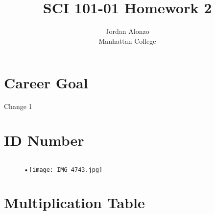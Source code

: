 \documentclass[11pt]{article}
\begin{document}
\title{SCI 101-01 Homework 2}
\author{Jordan Alonzo\\
Manhattan College}
\maketitle




\section {Career Goal}
Change 1

\section{ID Number}
\subsection{}
\begin{figure}[!h]
\begin{center}

•\texttt{[image: IMG\_4743.jpg]}
\end{center}
\end{figure}

\section {Multiplication Table}
\end{document}
